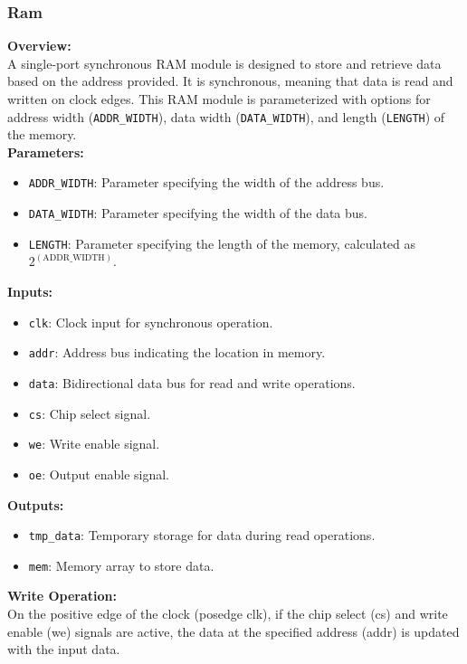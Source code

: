 \documentclass[12pt]{article}
\begin{document}
\subsubsection{Ram}
\textbf{Overview:}\\
A single-port synchronous RAM module is designed to store and retrieve data based on the address provided. It is synchronous, meaning that data is read and written on clock edges. This RAM module is parameterized with options for address width (\verb|ADDR_WIDTH|), data width (\verb|DATA_WIDTH|), and length (\verb|LENGTH|) of the memory.\\
\textbf{Parameters:}\\
\begin{itemize}
    \item \verb|ADDR_WIDTH|: Parameter specifying the width of the address bus.
    \item \verb|DATA_WIDTH|: Parameter specifying the width of the data bus.
    \item \verb|LENGTH|: Parameter specifying the length of the memory, calculated as $2^(\text{ADDR\_WIDTH})$.
\end{itemize}
\textbf{Inputs:}\\
\begin{itemize}
    \item \verb|clk|: Clock input for synchronous operation.
    \item \verb|addr|: Address bus indicating the location in memory.
    \item \verb|data|: Bidirectional data bus for read and write operations.
    \item \verb|cs|: Chip select signal.
    \item \verb|we|: Write enable signal.
    \item \verb|oe|: Output enable signal.
\end{itemize}
\textbf{Outputs:}\\
\begin{itemize}
    \item \verb|tmp_data|: Temporary storage for data during read operations.
    \item \verb|mem|: Memory array to store data.
\end{itemize}
\textbf{Write Operation:}\\
On the positive edge of the clock (posedge clk), if the chip select (cs) and write enable (we) signals are active, the data at the specified address (addr) is updated with the input data.\\
\end{document}
